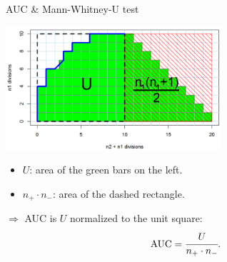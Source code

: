 \documentclass[11pt,compress,t,notes=noshow, xcolor=table]{beamer}
\begin{document}
\begin{vbframe}{AUC \& Mann-Whitney-U test}
\framebreak

\begin{center}
  \includegraphics[width=0.6\textwidth]{figure_man/roc-mannwhitney2.png}
\end{center}

\begin{itemize}
  \item $U$: area of the green bars on the left.
  \item $n_+ \cdot n_-$: area of the dashed rectangle.
\end{itemize}

\vfill
 
$\Rightarrow$ AUC is $U$ normalized to the unit square: \\
$$\text{AUC} = \cfrac{U}{n_+\cdot n_-}.$$

\end{vbframe}


\endlecture
\end{document}
